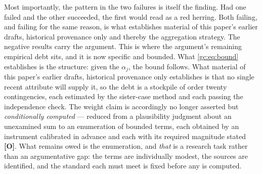 \begin{remark}
Most importantly, the pattern in the two failures is itself the
finding. Had one failed and the other succeeded, the first would read as
a red herring. Both failing, and failing for the same reason, is what
establishes material of this paper's earlier drafts, historical provenance only and thereby the
aggregation strategy. The negative results carry the argument. This is where the argument's remaining empirical debt sits, and it is
now specific and bounded. What \eqref{gc:eq:bound} establishes is the
structure: given the $\alpha_j$, the bound follows. What
material of this paper's earlier drafts, historical provenance only establishes is that no single recent
attribute will supply it, so the debt is a stockpile of order twenty
contingencies, each estimated by the sister-case method and each passing
the independence check. The weight claim is accordingly no longer
asserted but \emph{conditionally computed} --- reduced from a
plausibility judgment about an unexamined sum to an enumeration of
bounded terms, each obtained by an instrument calibrated in advance and
each with its required magnitude stated \textbf{[O]}. What remains owed
is the enumeration, and \emph{that} is a research task rather than an
argumentative gap: the terms are individually modest, the sources are
identified, and the standard each must meet is fixed before any is
computed.
\end{remark}

